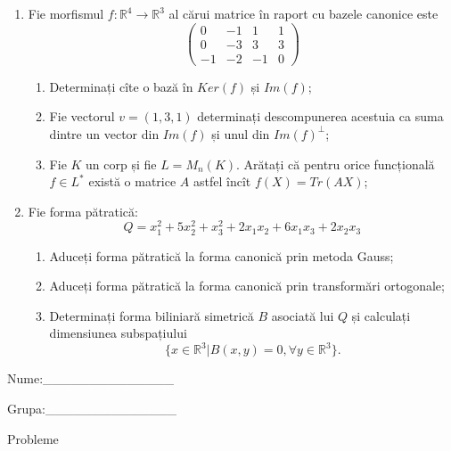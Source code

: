 \documentclass{article}
\begin{document}
\begin{enumerate}
 \item Fie morfismul $f:\mathbb{R}^4 \to \mathbb{R}^3$ al cărui matrice în raport cu bazele canonice este
$$\begin{pmatrix}
0&-1&1&1\\
0&-3&3&3\\
-1&-2&-1&0
\end{pmatrix}$$

\begin{enumerate}
\item Determinați cîte o bază în $Ker(f)$ și $Im(f)$;
\item Fie vectorul $v=(1,3,1)$ determinați descompunerea acestuia ca suma dintre un vector din $Im(f)$ și unul din $Im(f)^\perp$;
\item Fie $K$ un corp și fie $L=M_n(K)$. Arătați că pentru orice funcțională $f \in L^*$ există o matrice $A$ astfel încît $f(X)=Tr(AX)$;
\end{enumerate}
\item Fie forma pătratică:
$$Q= x_1^2+5x_2^2+x_3^2+2x_1x_2+6x_1x_3+2x_2x_3$$

\begin{enumerate}
\item Aduceți forma pătratică la forma canonică prin metoda Gauss;
\item Aduceți forma pătratică la forma canonică prin transformări ortogonale;
\item Determinați forma biliniară simetrică $B$ asociată lui $Q$ și calculați dimensiunea subspațiului
$$\{x \in \mathbb{R}^3 | B(x,y)=0,\forall y \in \mathbb{R}^3\}.$$

\end{enumerate}
\end{enumerate}
\newpage
\begin{flushright}
Nume:\_\_\_\_\_\_\_\_\_\_\_\_\_\_
 
 
Grupa:\_\_\_\_\_\_\_\_\_\_\_\_\_\_
\end{flushright}
\begin{center}
\vspace{2cm}
{\Large Probleme}
\vspace{2cm}
\end{center}
\end{document}
